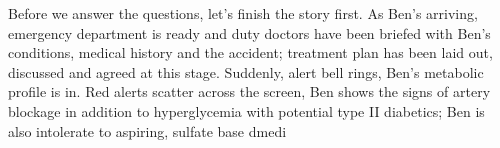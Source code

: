 Before we answer the questions, let's finish the story first. As Ben's arriving, emergency department is ready and duty doctors have been briefed with Ben's conditions, medical history and the accident; treatment plan has been laid out, discussed and agreed at this stage. Suddenly, alert bell rings, Ben's metabolic profile is in. Red alerts scatter across the screen, Ben shows the signs of artery blockage in addition to hyperglycemia with potential type II diabetics; Ben is also intolerate to aspiring, sulfate base dmedi